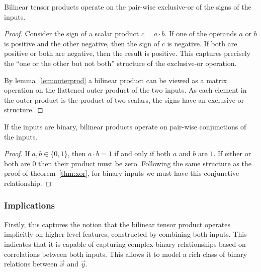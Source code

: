 \begin{thm}  \label{thm:xor}
Bilinear tensor products operate on the pair-wise exclusive-or of the
signs of the inputs.
\end{thm}
\begin{proof}
Consider the sign of a scalar product
\(c = a\cdot b\). If one of the operands \(a\) or \(b\) is positive and the other negative,
then the sign of \(c\) is negative. If both are positive or both are negative, then the
result is positive. This captures precisely the ``one or the other but not both'' structure
of the exclusive-or operation.

By lemma~\ref{lem:outerprod} a bilinear product can be viewed as a matrix operation on the flattened
outer product of the two inputs. As each element in the outer product is the product of two scalars,
the signs have an exclusive-or structure.
\end{proof}

\begin{cor}\label{cor:and}
If the inputs are binary, bilinear products operate on pair-wise conjunctions of the inputs.
\end{cor}
\begin{proof}
If \(a, b \in \{0, 1\}\), then \(a \cdot b = 1\) if and only if both \(a\) and \(b\) are \(1\). If
either or both are \(0\) then their product must be zero. Following the same structure as the proof
of theorem~\ref{thm:xor}, for binary inputs we must have this conjunctive relationship.
\end{proof}

\subsubsection{Implications}
Firstly, this captures the notion that the bilinear tensor product operates implicitly on higher
level features, constructed by combining both inputs. This indicates that it is capable of capturing
complex binary relationships based on correlations between both inputs. This allows it
to model a rich class of binary relations between \(\vec{x}\) and \(\vec{y}\).

